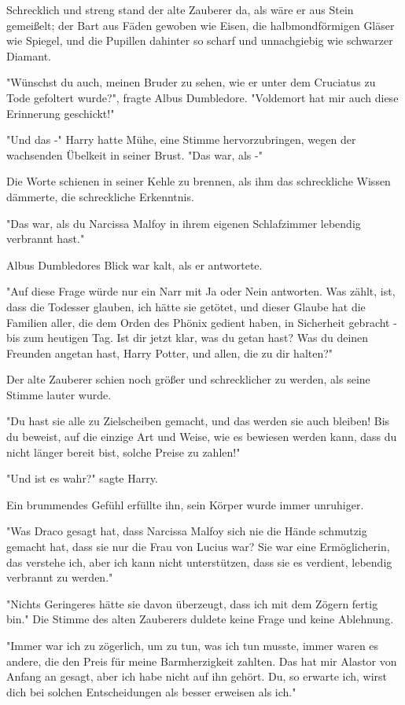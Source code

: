 {Schrecklich und streng stand der alte Zauberer da, als wäre er aus Stein gemeißelt; der Bart aus Fäden gewoben wie Eisen, die halbmondförmigen Gläser wie Spiegel, und die Pupillen dahinter so scharf und unnachgiebig wie schwarzer Diamant.

"Wünschst du auch, meinen Bruder zu sehen, wie er unter dem Cruciatus zu Tode gefoltert wurde?", fragte Albus Dumbledore. "Voldemort hat mir auch diese Erinnerung geschickt!"

"Und das -" Harry hatte Mühe, eine Stimme hervorzubringen, wegen der wachsenden Übelkeit in seiner Brust. "Das war, als -"

Die Worte schienen in seiner Kehle zu brennen, als ihm das schreckliche Wissen dämmerte, die schreckliche Erkenntnis.

"Das war, als du Narcissa Malfoy in ihrem eigenen Schlafzimmer lebendig verbrannt hast."

Albus Dumbledores Blick war kalt, als er antwortete.

"Auf diese Frage würde nur ein Narr mit Ja oder Nein antworten. Was zählt, ist, dass die Todesser glauben, ich hätte sie getötet, und dieser Glaube hat die Familien aller, die dem Orden des Phönix gedient haben, in Sicherheit gebracht - bis zum heutigen Tag. Ist dir jetzt klar, was du getan hast? Was du deinen Freunden angetan hast, Harry Potter, und allen, die zu dir halten?"

Der alte Zauberer schien noch größer und schrecklicher zu werden, als seine Stimme lauter wurde.

"Du hast sie alle zu Zielscheiben gemacht, und das werden sie auch bleiben! Bis du beweist, auf die einzige Art und Weise, wie es bewiesen werden kann, dass du nicht länger bereit bist, solche Preise zu zahlen!"

"Und ist es wahr?" sagte Harry.

Ein brummendes Gefühl erfüllte ihn, sein Körper wurde immer unruhiger.

"Was Draco gesagt hat, dass Narcissa Malfoy sich nie die Hände schmutzig gemacht hat, dass sie nur die Frau von Lucius war? Sie war eine Ermöglicherin, das verstehe ich, aber ich kann nicht unterstützen, dass sie es verdient, lebendig verbrannt zu werden."

"Nichts Geringeres hätte sie davon überzeugt, dass ich mit dem Zögern fertig bin." Die Stimme des alten Zauberers duldete keine Frage und keine Ablehnung.

"Immer war ich zu zögerlich, um zu tun, was ich tun musste, immer waren es andere, die den Preis für meine Barmherzigkeit zahlten. Das hat mir Alastor von Anfang an gesagt, aber ich habe nicht auf ihn gehört. Du, so erwarte ich, wirst dich bei solchen Entscheidungen als besser erweisen als ich."

}
